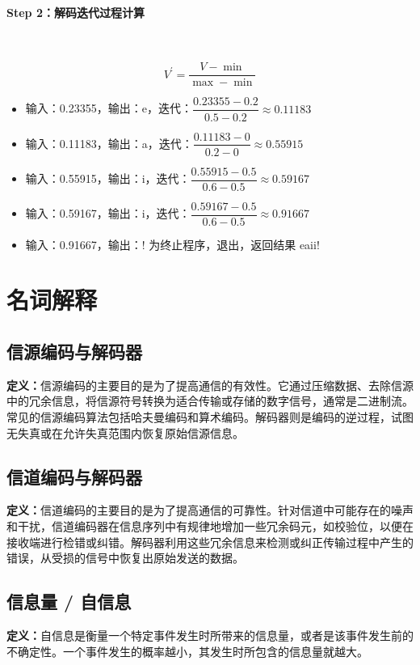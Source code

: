 \documentclass{article}
\begin{document}
\paragraph*{Step 2：解码迭代过程计算}~{}

\[ V^{'}=\dfrac{V-\min}{\max-\min} \]

\begin{itemize}[
    itemsep = 10pt,
    partopsep = 0pt,
    parsep = 0pt,
    topsep = 5pt,
    leftmargin = 2em,
    labelsep = 0.25em
]
    \item 输入：0.23355，输出：e，迭代：$\dfrac{0.23355-0.2}{0.5-0.2}\approx0.11183$
    \item 输入：0.11183，输出：a，迭代：$\dfrac{0.11183-0}{0.2-0}\approx0.55915$
    \item 输入：0.55915，输出：i，迭代：$\dfrac{0.55915-0.5}{0.6-0.5}\approx0.59167$
    \item 输入：0.59167，输出：i，迭代：$\dfrac{0.59167-0.5}{0.6-0.5}\approx0.91667$
    \item 输入：0.91667，输出：! 为终止程序，退出，返回结果 eaii!
\end{itemize}



\section{名词解释}
\subsection{信源编码与解码器}
\textbf{定义：}信源编码的主要目的是为了提高通信的有效性。它通过压缩数据、去除信源中的冗余信息，将信源符号转换为适合传输或存储的数字信号，通常是二进制流。常见的信源编码算法包括哈夫曼编码和算术编码。解码器则是编码的逆过程，试图无失真或在允许失真范围内恢复原始信源信息。



\subsection{信道编码与解码器}
\textbf{定义：}信道编码的主要目的是为了提高通信的可靠性。针对信道中可能存在的噪声和干扰，信道编码器在信息序列中有规律地增加一些冗余码元，如校验位，以便在接收端进行检错或纠错。解码器利用这些冗余信息来检测或纠正传输过程中产生的错误，从受损的信号中恢复出原始发送的数据。



\subsection{信息量 / 自信息}
\textbf{定义：}自信息是衡量一个特定事件发生时所带来的信息量，或者是该事件发生前的不确定性。一个事件发生的概率越小，其发生时所包含的信息量就越大。
\end{document}
